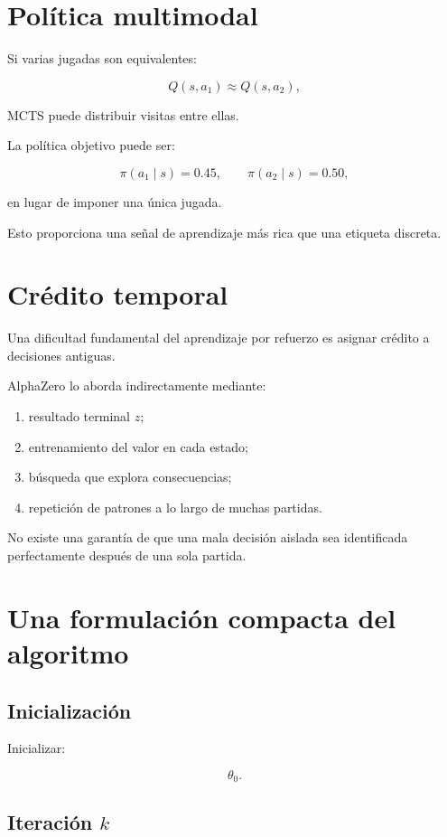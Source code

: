 \documentclass[11pt,a4paper]{article}
\begin{document}
\section{Política multimodal}

Si varias jugadas son equivalentes:

\[
Q(s,a_1)
\approx
Q(s,a_2),
\]

MCTS puede distribuir visitas entre ellas.

La política objetivo puede ser:

\[
\pi(a_1\mid s)=0.45,
\qquad
\pi(a_2\mid s)=0.50,
\]

en lugar de imponer una única jugada.

Esto proporciona una señal de aprendizaje más rica que una etiqueta discreta.

\section{Crédito temporal}

Una dificultad fundamental del aprendizaje por refuerzo es asignar crédito a decisiones antiguas.

AlphaZero lo aborda indirectamente mediante:

\begin{enumerate}
    \item resultado terminal \(z\);
    \item entrenamiento del valor en cada estado;
    \item búsqueda que explora consecuencias;
    \item repetición de patrones a lo largo de muchas partidas.
\end{enumerate}

No existe una garantía de que una mala decisión aislada sea identificada perfectamente después de una sola partida.

\section{Una formulación compacta del algoritmo}

\subsection*{Inicialización}

Inicializar:

\[
\theta_0.
\]

\subsection*{Iteración \(k\)}
\end{document}
